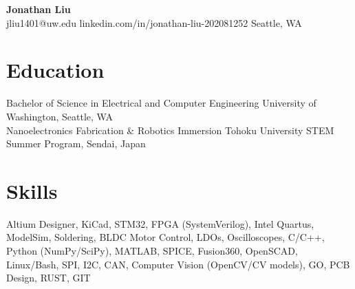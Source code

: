 \documentclass[11pt,letterpaper]{article}
\begin{document}
\begin{center}
{\LARGE \textbf{Jonathan Liu}}\\[2pt]
\small jliu1401@uw.edu \textbullet{} linkedin.com/in/jonathan-liu-202081252 \textbullet{} Seattle, WA
\end{center}
\section*{Education}
\noindent Bachelor of Science in Electrical and Computer Engineering \textbar{} University of Washington, Seattle, WA\\
\noindent Nanoelectronics Fabrication \& Robotics Immersion \textbar{} Tohoku University STEM Summer Program, Sendai, Japan\\
\section*{Skills}
Altium Designer, KiCad, STM32, FPGA (SystemVerilog), Intel Quartus, ModelSim, Soldering, BLDC Motor Control, LDOs, Oscilloscopes, C/C++, Python (NumPy/SciPy), MATLAB, SPICE, Fusion360, OpenSCAD, Linux/Bash, SPI, I2C, CAN, Computer Vision (OpenCV/CV models), GO, PCB Design, RUST, GIT
\end{document}
